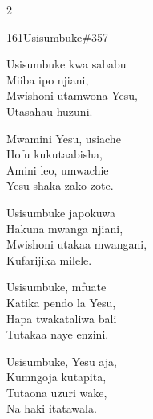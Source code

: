 \documentclass{article}
\begin{document}
\begin{multicols}{2}
\begin{hymn}{161}{Usisumbuke}{\#357}
\begin{stanza}
Usisumbuke kwa sababu\\
Miiba ipo njiani,\\
Mwishoni utamwona Yesu,\\
Utasahau huzuni.
\end{stanza}
\begin{chorus}
Mwamini Yesu, usiache\\
Hofu kukutaabisha,\\
Amini leo, umwachie\\
Yesu shaka zako zote.
\end{chorus}
\begin{stanza}
Usisumbuke japokuwa\\
Hakuna mwanga njiani,\\
Mwishoni utakaa mwangani,\\
Kufarijika milele.
\end{stanza}
\begin{stanza}
Usisumbuke, mfuate\\
Katika pendo la Yesu,\\
Hapa twakataliwa bali\\
Tutakaa naye enzini.
\end{stanza}
\begin{stanza}
Usisumbuke, Yesu aja,\\
Kumngoja kutapita,\\
Tutaona uzuri wake,\\
Na haki itatawala.
\end{stanza}
\end{hymn}


\end{multicols}
\end{document}
